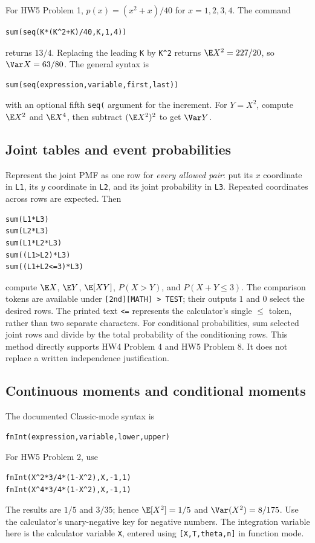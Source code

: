 For HW5 Problem 1, $p(x)=(x^2+x)/40$ for $x=1,2,3,4$. The command
\begin{verbatim}
sum(seq(K*(K^2+K)/40,K,1,4))
\end{verbatim}
returns $13/4$. Replacing the leading \texttt{K} by \texttt{K\^{}2} returns $\E X^2=227/20$, so $\Var X=63/80$. The general syntax is
\begin{verbatim}
sum(seq(expression,variable,first,last))
\end{verbatim}
with an optional fifth \texttt{seq(} argument for the increment. For $Y=X^2$, compute $\E X^2$ and $\E X^4$, then subtract $(\E X^2)^2$ to get $\Var Y$.

\subsection{Joint tables and event probabilities}
Represent the joint PMF as one row for \emph{every allowed pair}: put its $x$ coordinate in \texttt{L1}, its $y$ coordinate in \texttt{L2}, and its joint probability in \texttt{L3}. Repeated coordinates across rows are expected. Then
\begin{verbatim}
sum(L1*L3)
sum(L2*L3)
sum(L1*L2*L3)
sum((L1>L2)*L3)
sum((L1+L2<=3)*L3)
\end{verbatim}
compute $\E X$, $\E Y$, $\E[XY]$, $P(X>Y)$, and $P(X+Y\le3)$. The comparison tokens are available under \texttt{[2nd][MATH] > TEST}; their outputs $1$ and $0$ select the desired rows. The printed text \texttt{<=} represents the calculator's single $\le$ token, rather than two separate characters. For conditional probabilities, sum selected joint rows and divide by the total probability of the conditioning rows. This method directly supports HW4 Problem 4 and HW5 Problem 8. It does not replace a written independence justification.

\subsection{Continuous moments and conditional moments}
The documented Classic-mode syntax is
\begin{verbatim}
fnInt(expression,variable,lower,upper)
\end{verbatim}
For HW5 Problem 2, use
\begin{verbatim}
fnInt(X^2*3/4*(1-X^2),X,-1,1)
fnInt(X^4*3/4*(1-X^2),X,-1,1)
\end{verbatim}
The results are $1/5$ and $3/35$; hence $\E[X^2]=1/5$ and $\Var(X^2)=8/175$. Use the calculator's unary-negative key for negative numbers. The integration variable here is the calculator variable \texttt{X}, entered using \texttt{[X,T,theta,n]} in function mode.

